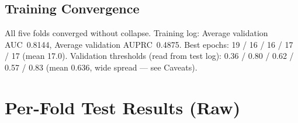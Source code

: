 \documentclass[10pt, a4paper]{article}
\begin{document}
\subsection{Training Convergence}

All five folds converged without collapse.
Training log: Average validation AUC~0.8144, Average validation AUPRC~0.4875.
Best epochs: 19 / 16 / 16 / 17 / 17 (mean 17.0).
Validation thresholds (read from test log): 0.36 / 0.80 / 0.62 / 0.57 / 0.83
(mean 0.636, wide spread --- see Caveats).

\section{Per-Fold Test Results (Raw)}

\begin{table}[h]
\centering
\caption{Test\_60 (13,144 residues): Sep 11 RSA-supervised gate, per-fold.}
\label{tab:t60_folds}
\end{table}
\end{document}
